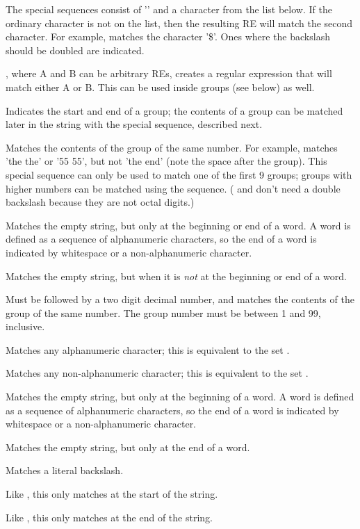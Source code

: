 The special sequences consist of '\code{\e}' and a character
from the list below.  If the ordinary character is not on the list,
then the resulting RE will match the second character.  For example,
\code{\e\$} matches the character '\$'.  Ones where the backslash
should be doubled are indicated.

\begin{itemize}
\item[\code{\e|}], where A and B can be arbitrary REs,
creates a regular expression that will match either A or B.  This can
be used inside groups (see below) as well.
%
\item[\code{\e( \e)}] Indicates the start and end of a group; the
contents of a group can be matched later in the string with the
\code{\e [1-9]} special sequence, described next.
%
{\fulllineitems\item[\code{\e \e 1, ... \e \e 7, \e 8, \e 9}]
Matches the contents of the group of the same
number.  For example,  matches 'the the' or
'55 55', but not 'the end' (note the space after the group).  This
special sequence can only be used to match one of the first 9 groups;
groups with higher numbers can be matched using the 
sequence.  ( and  don't need a double backslash
because they are not octal digits.)}
%
\item[\code{\e \e b}] Matches the empty string, but only at the
beginning or end of a word.  A word is defined as a sequence of
alphanumeric characters, so the end of a word is indicated by
whitespace or a non-alphanumeric character.
%
\item[\code{\e B}] Matches the empty string, but when it is \emph{not} at the
beginning or end of a word.
%
\item[\code{\e v}] Must be followed by a two digit decimal number, and
matches the contents of the group of the same number.  The group number must be between 1 and 99, inclusive.
%
\item[\code{\e w}]Matches any alphanumeric character; this is
equivalent to the set \code{[a-zA-Z0-9]}.
%
\item[\code{\e W}] Matches any non-alphanumeric character; this is
equivalent to the set \code{[\^a-zA-Z0-9]}.
\item[\code{\e <}] Matches the empty string, but only at the beginning of a
word.  A word is defined as a sequence of alphanumeric characters, so
the end of a word is indicated by whitespace or a non-alphanumeric 
character.
\item[\code{\e >}] Matches the empty string, but only at the end of a
word.

\item[\code{\e \e \e \e}] Matches a literal backslash.

\item[\code{\e `}] Like \code{\^}, this only matches at the start of the
string.
\item[\code{\e \e '}] Like \code{\$}, this only matches at the end of the
string.
\end{itemize}

